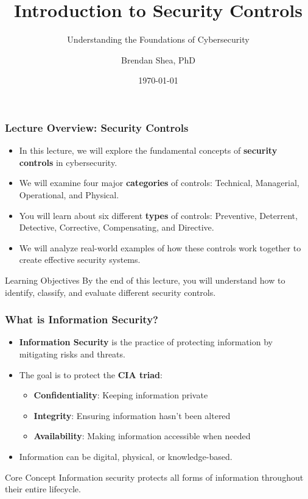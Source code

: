 \documentclass{beamer}
\title{Introduction to Security Controls}
\subtitle{Understanding the Foundations of Cybersecurity}
\author{Brendan Shea, PhD}
\date{\today}
\begin{document}
\begin{frame}
    \titlepage
\end{frame}

\begin{frame}
    \frametitle{Lecture Overview: Security Controls}
    
    \begin{itemize}
        \item In this lecture, we will explore the fundamental concepts of \textbf{security controls} in cybersecurity.
        
        \item We will examine four major \textbf{categories} of controls: Technical, Managerial, Operational, and Physical.
        
        \item You will learn about six different \textbf{types} of controls: Preventive, Deterrent, Detective, Corrective, Compensating, and Directive.
        
        \item We will analyze real-world examples of how these controls work together to create effective security systems.
    \end{itemize}
    
    \begin{block}{Learning Objectives}
        By the end of this lecture, you will understand how to identify, classify, and evaluate different security controls.
    \end{block}
\end{frame}

\begin{frame}
    \frametitle{What is Information Security?}
    
    \begin{itemize}
        \item \textbf{Information Security} is the practice of protecting information by mitigating risks and threats.
        
        \item The goal is to protect the \textbf{CIA triad}:
        \begin{itemize}
            \item \textbf{Confidentiality}: Keeping information private
            \item \textbf{Integrity}: Ensuring information hasn't been altered
            \item \textbf{Availability}: Making information accessible when needed
        \end{itemize}
        
        \item Information can be digital, physical, or knowledge-based.
    \end{itemize}
    
    \begin{alertblock}{Core Concept}
        Information security protects all forms of information throughout their entire lifecycle.
    \end{alertblock}
\end{frame}
\end{document}
